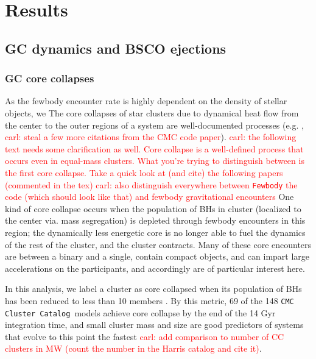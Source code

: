 \documentclass[twocolumn]{aastex631}
\newcommand{\CMCcat}{\texttt{CMC Cluster Catalog}}
\newcommand{\carl}[1]{\textcolor{red}{carl: #1}}
\begin{document}
\section{Results} \label{sec:results}

\subsection{GC dynamics and BSCO ejections} \label{subsec:gcdyns}

\subsubsection{GC core collapses} \label{subsubsec:cc}

As the fewbody encounter rate is highly dependent on the density of stellar objects, we 
The core collapses of star clusters due to dynamical heat flow from the center to the outer regions of a system are well-documented processes (e.g. \citealt{1968MNRAS.138..495L}, \citealt{2020IAUS..351..357K} \carl{steal a few more citations from the CMC code paper}).
\carl{ the following text needs some clarification as well.  Core collapse is a well-defined process that occurs even in equal-mass clusters.  What you're trying to distinguish between is the first core collapse.  Take a quick look at (and cite) the following papers (commented in the tex)}
\carl{also distinguish everywhere between \texttt{Fewbody} the code (which should look like that) and fewbody gravitational encounters}
One kind of core collapse occurs when the population of BHs in cluster (localized to the center via. mass segregation) is depleted through fewbody encounters in this region; the dynamically less energetic core is no longer able to fuel the dynamics of the rest of the cluster, and the cluster contracts.
Many of these core encounters are between a binary and a single, contain compact objects, and can impart large accelerations on the participants, and accordingly are of particular interest here.

In this analysis, we label a cluster as core collapsed when its population of BHs has been reduced to less than 10 members \citep[following][]{2020IAUS..351..357K}.
By this metric, 69 of the 148 \CMCcat\ models achieve core collapse by the end of the 14 Gyr integration time, and small cluster mass and size are good predictors of systems that evolve to this point the fastest \carl{add comparison to number of CC clusters in MW (count the number in the Harris catalog and cite it)}.  
\end{document}
